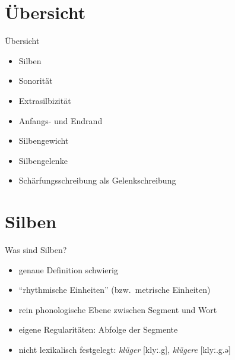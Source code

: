 \section{Übersicht}

\begin{frame}
  {Übersicht}
  \onslide<+->
  \begin{itemize}[<+->]
    \item Silben
    \item Sonorität
    \item Extrasilbizität
    \item Anfangs- und Endrand
    \item Silbengewicht
      \Zeile
    \item Silbengelenke
    \item Schärfungsschreibung als Gelenkschreibung
  \end{itemize}
\end{frame}

\section{Silben}

\begin{frame}
  {Was sind Silben?}
  \pause
  \begin{itemize}[<+->]
    \item genaue Definition schwierig
    \item "`rhythmische Einheiten"' (bzw.\ metrische Einheiten)
      \Zeile
    \item \alert{rein phonologische} Ebene \alert{zwischen Segment und Wort}
    \item eigene \alert{Regularitäten}: Abfolge der Segmente
      \Zeile
    \item \alert{nicht lexikalisch festgelegt}: \textit{klüger} [klyː.g], \textit{klügere} [klyː.g.ə]
  \end{itemize}
\end{frame}

